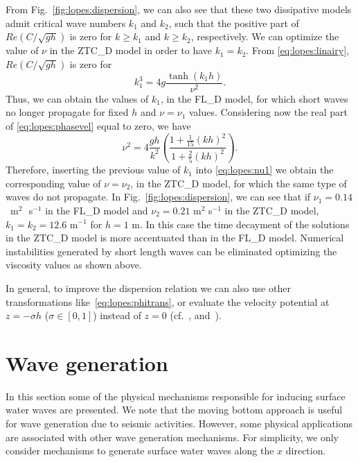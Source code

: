 \noindent From Fig.~\ref{fig:lopes:dispersion}, we can also see that
these two dissipative models admit critical wave numbers
$k_1$ and $k_2$, such that the positive part of
$\displaystyle Re\left(C/\sqrt{gh}\right)$ is zero for
$k\geq k_1$ and $k\geq k_2$, respectively.
We can optimize the value of $\nu$ in the ZTC\_D model in
order to have $k_1=k_2$.
From \eqref{eq:lopes:linairy},  $\displaystyle
Re\left(C/\sqrt{gh}\right)$ is zero for
\begin{equation}
k_1^3=4g\frac{\tanh{(k_1h)}}{\nu^2}.
\end{equation}
Thus, we can obtain the values of $k_1$, in the FL\_D model,
for which short waves no longer propagate for fixed $h$ and
$\nu=\nu_1$ values.  Considering now the real part of
\eqref{eq:lopes:phasevel} equal to zero, we have
\begin{equation}\label{eq:lopes:nu1}
\nu^2=4\frac{gh}{k^2}\left(\frac{1+\frac{1}{15}(kh)^2}{1+\frac{2}{5}(kh)^2}\right).
\end{equation}
Therefore, inserting the previous value of $k_1$ into
\eqref{eq:lopes:nu1} we obtain the corresponding value of
$\nu=\nu_2$, in the ZTC\_D model, for which the same type of waves
do not propagate.
In Fig.~\ref{fig:lopes:dispersion}, we can
see that if $\nu_1=0.14\, $~m$^2\,$~s$^{-1}$ in
the FL\_D model   and $\nu_2=0.21$
m$^2$ s$^{-1}$ in the ZTC\_D model, $k_1=k_2=12.6$ m$^{-1}$
for $h=1$ m.
In this case the time  decayment of the solutions in
the ZTC\_D model is more accentuated than in the FL\_D
model.
Numerical instabilities generated by short length waves can
be eliminated optimizing the viscosity values as shown above.

In general, to improve the dispersion relation we can also
use other transformations like~\eqref{eq:lopes:phitrans}, or
evaluate the velocity potential at $z=-\sigma h$
($\sigma\in[0,1]$) instead of $z=0$
(cf.~\cite{BinghamMadsenFuhrman2008}, \cite{MadsenAgnon2003}
and~\cite{MadsenBinghamSchaffer2003}).

\section{Wave generation}\label{sec:lopes:wavegeneration}
In this section some of the physical mechanisms responsible
for inducing surface water waves are presented.  We note
that the moving bottom approach is useful for wave
generation due to seismic activities. However, some physical
applications are associated with other wave generation
mechanisms.  For simplicity, we only consider mechanisms to
generate surface water waves along the $x$ direction.

